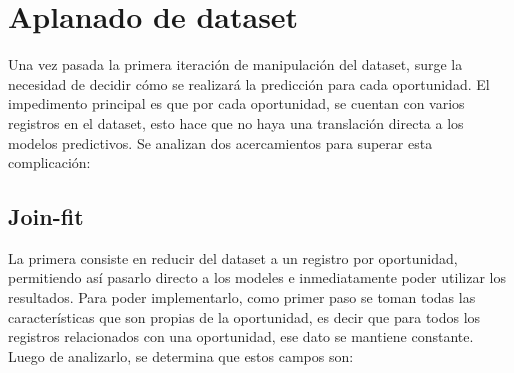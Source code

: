 \documentclass[titlepage,a4paper]{article}
\begin{document}
\section{Aplanado de dataset}\label{sec:aplanado_dataset}
Una vez pasada la primera iteración de manipulación del dataset, surge la necesidad de decidir cómo se realizará la predicción para cada oportunidad. El impedimento principal es que por cada oportunidad, se cuentan con varios registros en el dataset, esto hace que no haya una translación directa a los modelos predictivos. Se analizan dos acercamientos para superar esta complicación:

\subsection{Join-fit}\label{sub:joinfit}
La primera consiste en reducir del dataset a un registro por oportunidad, permitiendo así pasarlo directo a los modeles e inmediatamente poder utilizar los resultados. Para poder implementarlo, como primer paso se toman todas las características que son propias de la oportunidad, es decir que para todos los registros relacionados con una oportunidad, ese dato se mantiene constante. Luego de analizarlo, se determina que estos campos son: 
\end{document}
